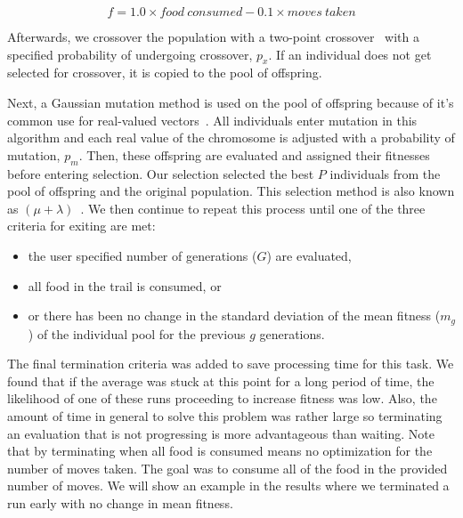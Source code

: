 \begin{equation} \label{eq:fitness_equation}
f = 1.0 \times food\:consumed - 0.1 \times moves\:taken
\end{equation}

Afterwards, we crossover the population with a two-point crossover~\cite{De_Jong1975-wc} with a specified probability of undergoing crossover, $p_x$. If an individual does not get selected for crossover, it is copied to the pool of offspring.

Next, a Gaussian mutation method is used on the pool of offspring because of it's common use for real-valued vectors~\cite{Baeck2000-co}. All individuals enter mutation in this algorithm and each real value of the chromosome is adjusted with a probability of mutation, $p_m$. Then, these offspring are evaluated and assigned their fitnesses before entering selection. Our selection selected the best $P$ individuals from the pool of offspring and the original population. This selection method is also known as $(\mu + \lambda)$~\cite{Schwefel1976-er}. We then continue to repeat this process until one of the three criteria for exiting are met:

\begin{itemize}
\item the user specified number of generations ($G$) are evaluated,
\item all food in the trail is consumed, or
\item or there has been no change in the standard deviation of the mean fitness ($m_g$) of the individual pool for the previous $g$ generations.
\end{itemize}

The final termination criteria was added to save processing time for this task. We found that if the average was stuck at this point for a long period of time, the likelihood of one of these runs proceeding to increase fitness was low. Also, the amount of time in general to solve this problem was rather large so terminating an evaluation that is not progressing is more advantageous than waiting. Note that by terminating when all food is consumed means no optimization for the number of moves taken. The goal was to consume all of the food in the provided number of moves. We will show an example in the results where we terminated a run early with no change in mean fitness.

